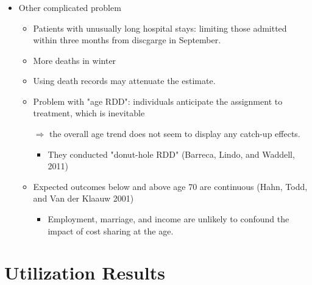 \documentclass[dvipdfmx,11pt]{beamer}
\begin{document}
\begin{frame}\frametitle{}
  \begin{itemize}
    \item Other complicated problem
    \begin{itemize}
      \item Patients with unusually long hospital stays: limiting those admitted within three months from discgarge in September.
      \item More deaths in winter
      \item Using death records may attenuate the estimate.
      \item Problem with "age RDD": individuals anticipate the assignment to treatment, which is inevitable

      $\Rightarrow$ the overall age trend does not seem to display any catch-up effects.
      \begin{itemize}
        \item They conducted "donut-hole RDD" (Barreca, Lindo, and Waddell, 2011)
      \end{itemize}
      \item Expected outcomes below and above age 70 are continuous (Hahn, Todd, and Van der Klaauw 2001)
      \begin{itemize}
        \item Employment, marriage, and income are unlikely to confound the impact of cost sharing at the age.
      \end{itemize}
    \end{itemize}
  \end{itemize}
\end{frame}

\section{Utilization Results}
\frame{\sectionpage}
\end{document}
